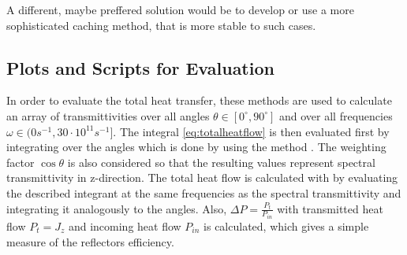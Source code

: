 A different, maybe preffered solution would be to develop or use a more
sophisticated caching method, that is more stable to such cases.



\subsection{Plots and Scripts for Evaluation}
In order to evaluate the total heat transfer, these methods are used to
calculate an array of transmittivities over all angles
$\theta\in[0^{\circ},90^{\circ}]$ and over all frequencies
$\omega \in (0\si{s^{-1}}, 30\cdot 10^{11}\si{s^{-1}}] $. The integral
\ref{eq:totalheatflow} is then evaluated first by integrating over the angles
which is done by  using the method
. The weighting factor $\cos \theta$ is also considered so
that the resulting values represent spectral transmittivity in z-direction.
The total heat flow is calculated with  by evaluating
the described integrant at the same frequencies as the spectral transmittivity
and integrating it analogously to the angles. Also,
$\Delta P=\frac{P_{t}}{P_{in}}$ with transmitted heat flow $P_{t}=J_z$ and
incoming heat flow $P_{in}$ is calculated, which gives a simple measure of the
reflectors efficiency.

